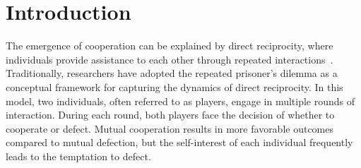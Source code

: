 \documentclass{article}
\theoremstyle{definition}
\begin{document}
\begin{abstract}





\end{abstract}

\section{Introduction}

The emergence of cooperation can be explained by direct reciprocity, where
individuals provide assistance to each other through repeated interactions~\cite{axelrod:AAAS:1981,
nowak:Science:2006, sigmund2010}. Traditionally, researchers have adopted the repeated prisoner's dilemma
as a conceptual framework for capturing the dynamics of direct reciprocity. In
this model, two individuals, often referred to as players, engage in multiple
rounds of interaction. During each round, both players face the decision of
whether to cooperate or defect. Mutual cooperation results in more favorable
outcomes compared to mutual defection, but the self-interest of each individual
frequently leads to the temptation to defect.
\end{document}
